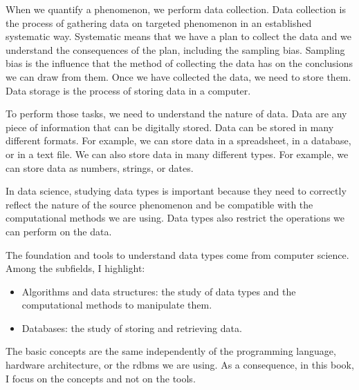 When we quantify a phenomenon, we perform data collection.  Data collection is the process
of gathering data on targeted phenomenon in an established systematic way.
Systematic means that we have a plan to collect the data and we understand the
consequences of the plan, including the sampling bias.  Sampling bias is the influence
that the method of collecting the data has on the conclusions we can draw from them.
Once we have collected the data, we need to store them.  Data storage is the process of
storing data in a computer.

To perform those tasks, we need to understand the nature of data.  Data are any piece of
information that can be digitally stored.  Data can be stored in many different formats.
For example, we can store data in a spreadsheet, in a database, or in a text file.  We can
also store data in many different types.  For example, we can store data as numbers,
strings, or dates.

In data science, studying data types is important because they need to correctly reflect
the nature of the source phenomenon and be compatible with the computational methods we
are using.  Data types also restrict the operations we can perform on the data.

The foundation and tools to understand data types come from computer science.  Among the
subfields, I highlight:
\begin{itemize}
  \item Algorithms and data structures: the study of data types and the computational
    methods to manipulate them.
  \item Databases: the study of storing and retrieving data.
\end{itemize}

The basic concepts are the same independently of the programming language, hardware
architecture, or the \gls{rdbms} we are using.  As a consequence, in this book, I focus on
the concepts and not on the tools.

